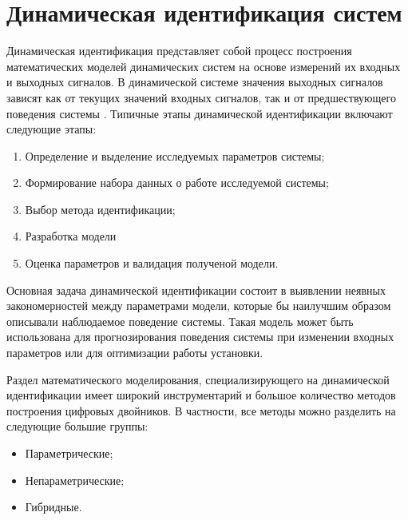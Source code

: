 \chapter{Динамическая идентификация систем}

Динамическая идентификация представляет собой процесс построения математических
моделей динамических систем на основе измерений их входных и выходных сигналов.
В динамической системе значения выходных сигналов зависят как от текущих
значений входных сигналов, так и от предшествующего поведения системы
\cite{bb:identification}. Типичные этапы динамической идентификации включают
следующие этапы: 

\begin{enumerate}
  \item Определение и выделение исследуемых параметров системы;
  \item Формирование набора данных о работе исследуемой системы;
  \item Выбор метода идентификации;
  \item Разработка модели
  \item Оценка параметров и валидация полученой модели.
\end{enumerate}

Основная задача динамической идентификации состоит в выявлении неявных
закономерностей между параметрами модели, которые бы наилучшим образом
описывали наблюдаемое поведение системы. Такая модель может быть использована
для прогнозирования поведения системы при изменении входных параметров или для
оптимизации работы установки. 

Раздел математического моделирования, специализирующего на динамической
идентификации имеет широкий инструментарий и большое количество методов
построения цифровых двойников. В частности, все методы можно разделить на
следующие большие группы:

\begin{itemize}
  \item Параметрические;
  \item Непараметрические;
  \item Гибридные.
\end{itemize}

